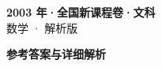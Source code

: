 \documentclass[zihao=-4, a4paper]{ctexart}
\begin{document}
\begin{center}
  {\Large\bfseries 2003 年·全国新课程卷·文科}\\[4pt]
  {\large 数学 · 解析版}
\end{center}
\medskip
{}

\clearpage
{}
\begin{center}{\Large\bfseries 参考答案与详细解析}\end{center}
\medskip

\end{document}
